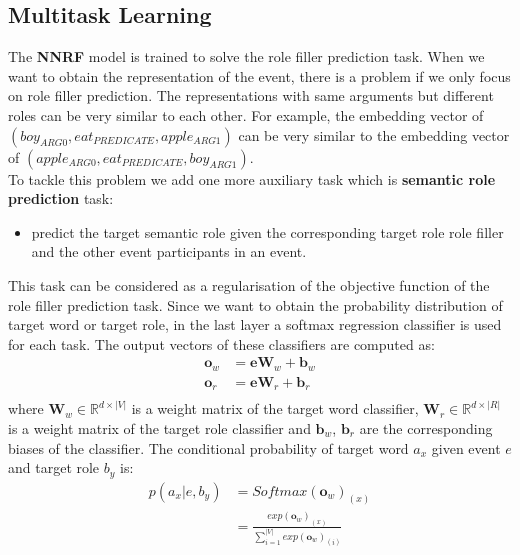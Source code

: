\documentclass[a4paper]{article}
\begin{document}
\subsection{Multitask Learning} \label{sec:mtl}
The \textbf{NNRF} model is trained to solve the role filler prediction task. When we want to obtain the representation of the event, there is a problem if we only focus on role filler prediction. The representations with same arguments but different roles can be very similar to each other. For example, the embedding vector of $(boy_{ARG0}, eat_{PREDICATE}, apple_{ARG1})$ can be very similar to the embedding vector of  $(apple_{ARG0}, eat_{PREDICATE}, boy_{ARG1})$. \\
To tackle this problem we add one more auxiliary task which is  \textbf{semantic role prediction} task:
\begin{itemize}
  \item  predict the target semantic role given the corresponding target role role filler and the other event participants  in an event.
\end{itemize}
This task can be considered as a regularisation of the objective function of the role filler prediction task.
\noindent
Since we want to obtain the probability distribution of target word or target role, in the last layer a softmax regression classifier is used for each task. The output vectors of these classifiers are computed as:
\begin{equation} \label{eq:output}
\begin{aligned}
    \mathbf{o}_w
        &= \mathbf{e}\mathbf{W}_w + \mathbf{b}_w \\
    \mathbf{o}_r
        &= \mathbf{e}\mathbf{W}_r + \mathbf{b}_r \\
\end{aligned}
\end{equation}
where $\mathbf{W}_w \in \mathbb{R}^{d \times |V|}$ is a weight matrix of the target word classifier,  $\mathbf{W}_r \in \mathbb{R}^{d \times |R|}$ is a weight matrix of the target role classifier and $\mathbf{b}_w$, $\mathbf{b}_r$ are the corresponding biases of the classifier. The conditional probability of target word $a_x$ given event $e$ and target role $b_y$ is:
\begin{equation} \label{eq:softmax_w}
\begin{aligned}
    p(a_x | e, b_y)
        &= Softmax(\mathbf{o}_w)_{(x)} \\
        &= \frac{
        exp(\mathbf{o}_w)_{(x)}
        }{
        \sum_{i=1}^{|V|} exp(\mathbf{o}_w)_{(i)} }   \\
\end{aligned}
\end{equation}
\end{document}
